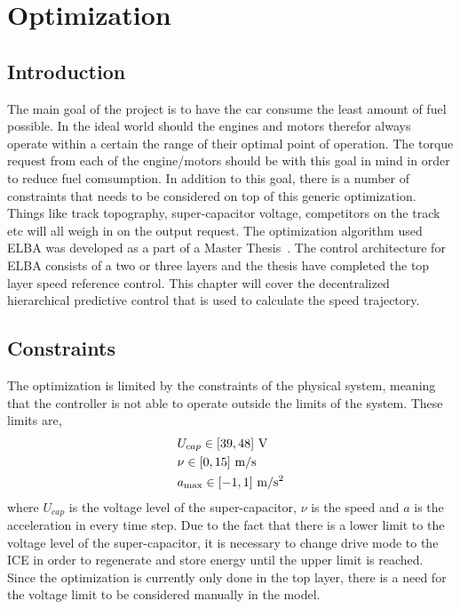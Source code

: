 \chapter{Optimization}
\section{Introduction}
The main goal of the project is to have the car consume the least amount of fuel
possible. In the ideal world should the engines and motors therefor always operate
within a certain the range of their optimal point of operation. The torque request
from each of the engine/motors should be with this goal in mind in order to reduce
fuel comsumption. In addition to this goal, there is a number of constraints that
needs to be considered on top of this generic optimization.  Things like track
topography, super-capacitor voltage, competitors on the track etc will all weigh in
on the output request. The optimization algorithm used ELBA was developed as a part
of a Master Thesis~\cite{liu2016}. The control architecture for ELBA consists of a
two or three layers and the thesis have completed the top layer speed reference
control. This chapter will cover the decentralized hierarchical predictive control
that is used to calculate the speed trajectory.

\section{Constraints}
The optimization is limited by the constraints of the physical system, meaning that
the controller is not able to operate outside the limits of the system. These limits
are,
\begin{align}
    &U_{cap} \in [39,48]~\textup{V} \\
    &\nu \in [0,15]~\textup{m/s}\\
    &a_{\max} \in [-1,1]~\textup{m/s$^2$}
\end{align}
where $U_{cap}$ is the voltage level of the super-capacitor, $\nu$ is the speed and
$a$ is the acceleration in every time step. Due to the fact that there is a lower
limit to the voltage level of the super-capacitor, it is necessary to change drive
mode to the ICE in order to regenerate and store energy until the upper limit is
reached. Since the optimization is currently only done in the top layer, there
is a need for the voltage limit to be considered manually in the model.

